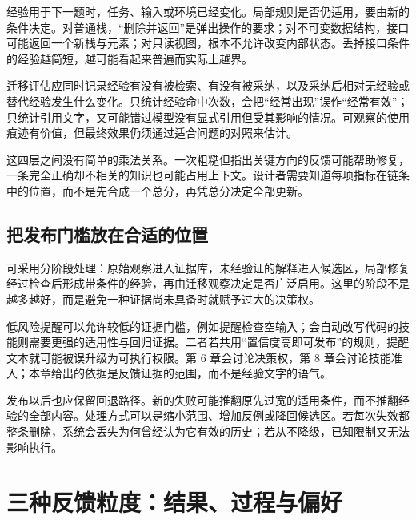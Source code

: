经验用于下一题时，任务、输入或环境已经变化。局部规则是否仍适用，要由新的条件决定。对普通栈，“删除并返回”是弹出操作的要求；对不可变数据结构，接口可能返回一个新栈与元素；对只读视图，根本不允许改变内部状态。丢掉接口条件的经验越简短，越可能看起来普遍而实际上越界。

迁移评估应同时记录经验有没有被检索、有没有被采纳，以及采纳后相对无经验或替代经验发生什么变化。只统计经验命中次数，会把“经常出现”误作“经常有效”；只统计引用文字，又可能错过模型没有显式引用但受其影响的情况。可观察的使用痕迹有价值，但最终效果仍须通过适合问题的对照来估计。

这四层之间没有简单的乘法关系。一次粗糙但指出关键方向的反馈可能帮助修复，一条完全正确却不相关的知识也可能占用上下文。设计者需要知道每项指标在链条中的位置，而不是先合成一个总分，再凭总分决定全部更新。

\subsection{把发布门槛放在合适的位置}

可采用分阶段处理：原始观察进入证据库，未经验证的解释进入候选区，局部修复经过检查后形成带条件的经验，再由迁移观察决定是否广泛启用。这里的阶段不是越多越好，而是避免一种证据尚未具备时就赋予过大的决策权。

低风险提醒可以允许较低的证据门槛，例如提醒检查空输入；会自动改写代码的技能则需要更强的适用性与回归证据。二者若共用“置信度高即可发布”的规则，提醒文本就可能被误升级为可执行权限。第 6 章会讨论决策权，第 8 章会讨论技能准入；本章给出的依据是反馈证据的范围，而不是经验文字的语气。

发布以后也应保留回退路径。新的失败可能推翻原先过宽的适用条件，而不推翻经验的全部内容。处理方式可以是缩小范围、增加反例或降回候选区。若每次失效都整条删除，系统会丢失为何曾经认为它有效的历史；若从不降级，已知限制又无法影响执行。


\section{三种反馈粒度：结果、过程与偏好}
\label{sec:ch04-grain}

